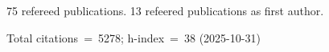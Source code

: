 75 refereed publications. 13 refeered publications as first author.

Total citations~=~5278; h-index~=~38 (2025-10-31)